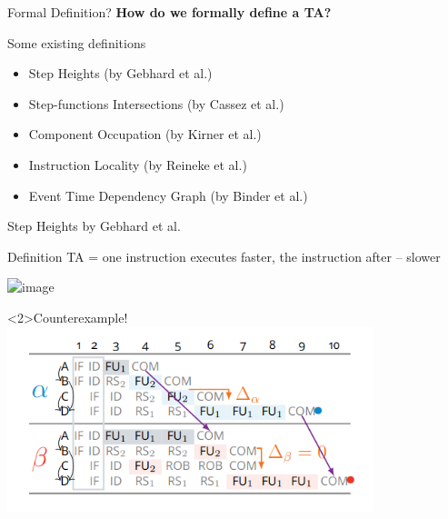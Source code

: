 \documentclass{beamer}
\begin{document}
\begin{frame}{Formal Definition?}
    \textbf{How do we formally define a TA?}

    \begin{block}{Some existing definitions}
        \begin{itemize}
            \item Step Heights (by Gebhard et al.)
            \item Step-functions Intersections (by Cassez et al.)
            \item Component Occupation (by Kirner et al.)
            \item Instruction Locality (by Reineke et al.)
            \item Event Time Dependency Graph (by Binder et al.)
        \end{itemize}
    \end{block}
\end{frame}

\begin{frame}{Step Heights by Gebhard et al.}
    \begin{block}{Definition}
        TA = one instruction executes faster, the instruction after -- slower
    \end{block}

    \includegraphics<1>[width=\textwidth]{pic/step-height-good.png}

    \begin{alertblock}<2>{Counterexample!}
        \includegraphics[width=0.8\textwidth]{pic/step-height-bad.png}
    \end{alertblock}
\end{frame}
\end{document}
